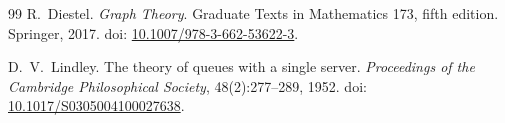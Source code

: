 \documentclass[11pt]{article}
\theoremstyle{plain}
\theoremstyle{definition}
\theoremstyle{remark}
\begin{document}
\begin{thebibliography}{99}
R.~Diestel.
\newblock \emph{Graph Theory}.
\newblock Graduate Texts in Mathematics 173, fifth edition.
Springer, 2017.
\newblock doi: \href{https://doi.org/10.1007/978-3-662-53622-3}{10.1007/978-3-662-53622-3}.

D.~V.~Lindley.
\newblock The theory of queues with a single server.
\newblock \emph{Proceedings of the Cambridge Philosophical Society},
48(2):277--289, 1952.
\newblock doi: \href{https://doi.org/10.1017/S0305004100027638}{10.1017/S0305004100027638}.

\end{thebibliography}
\end{document}
